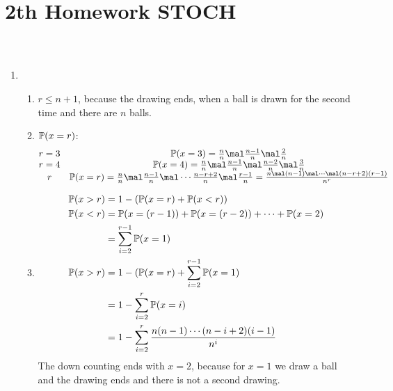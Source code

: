 
\section{2th Homework STOCH}
\subsection{}

\begin{solution}\
	\begin{enumerate}[label=\alph*)]
		\item \begin{enumerate}[label=\arabic*)]
			\item $r \le n +1$, because the drawing ends, when a ball is drawn for the second time and there are $n$ balls.
			\item $\mathbb{P}(x = r)$:
			\begin{align*}
				\begin{matrix}
				r = 3 & \Meas(x = 3) = \frac{n}{n} \mal \frac{n-1}{n}\mal \frac{2}{n}\\
				r = 4 & \Meas(x = 4) = \frac{n}{n} \mal \frac{n-1}{n}\mal \frac{n-2}{n} \mal \frac{3}{n}\\
				r & \Meas(x = r) = \frac{n}{n} \mal \frac{n-1}{n}\mal \cdots \frac{n-r+2}{n} \mal \frac{r-1}{n} = \frac{n\mal (n-1)\mal \cdots \mal (n-r+2)(r-1)}{n^r}
				\end{matrix}
			\end{align*}
			\item 
			\begin{align*}
				\mathbb{P}(x>r) &= 1 - (\mathbb{P}(x=r) +\mathbb{P}(x < r))\\
				\mathbb{P}(x<r) &= \mathbb{P}(x = (r-1)) + \mathbb{P}(x = (r-2)) + \cdots + \mathbb{P}(x=2)\\
				&= \sum_{i=2}^{r-1} \mathbb{P}(x=1)\\
				\mathbb{P}(x>r) &= 1 - (\mathbb{P}(x=r) + \sum_{i=2}^{r-1} \mathbb{P}(x=1)\\
				&= 1 - \sum_{i=2}^r \mathbb{P}(x=i)\\
				&= 1 - \sum_{i=2}^r \frac{n(n-1)\cdots(n-i +2)(i-1)}{n^i}
			\end{align*}
			The down counting ends with $x=2$, because for $x=1$ we draw a ball and the drawing ends and there is not a second drawing.

\end{enumerate}
\end{enumerate}
\end{solution}
